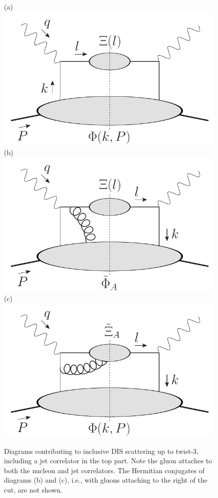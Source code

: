 \documentclass[preprintnumbers,floatfix,nofootinbib]{revtex4}
\begin{document}
\begin{figure}[bt]
  \centering
  (a)\includegraphics[width=0.3\linewidth,valign=t]{jetdiagram0}
  \hfill
  (b)\includegraphics[width=0.3\linewidth,valign=t]{jetdiagram2}
  \hfill
  (c)\includegraphics[width=0.3\linewidth,valign=t]{jetdiagram1}
  \caption{Diagrams contributing to inclusive DIS scattering up to twist-3, including a jet correlator in the top part. Note the gluon attaches to both the nucleon and jet correlators. The Hermitian conjugates of diagrams (b) and (c), i.e., with gluons attaching to the right of the cut, are not shown.
  }
  \label{fig:handbags}
\end{figure}
\end{document}
